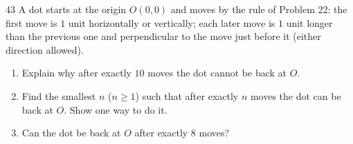 \begin{probbox}{43}{}
A dot starts at the origin $O(0,0)$ and moves by the rule of Problem 22: the first move is $1$ unit horizontally or vertically; each later move is $1$ unit longer than the previous one and perpendicular to the move just before it (either direction allowed).
\begin{enumerate}[label=\alph*),leftmargin=1.6em,itemsep=1pt]
\item Explain why after exactly $10$ moves the dot cannot be back at $O$.
\item Find the smallest $n$ ($n\ge 1$) such that after exactly $n$ moves the dot can be back at $O$. Show one way to do it.
\item Can the dot be back at $O$ after exactly $8$ moves?
\end{enumerate}
\end{probbox}
